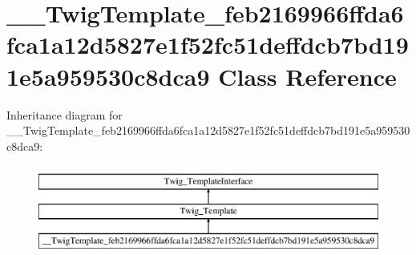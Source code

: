 \hypertarget{class_____twig_template__feb2169966ffda6fca1a12d5827e1f52fc51deffdcb7bd191e5a959530c8dca9}{}\section{\+\_\+\+\_\+\+Twig\+Template\+\_\+feb2169966ffda6fca1a12d5827e1f52fc51deffdcb7bd191e5a959530c8dca9 Class Reference}
\label{class_____twig_template__feb2169966ffda6fca1a12d5827e1f52fc51deffdcb7bd191e5a959530c8dca9}
Inheritance diagram for \+\_\+\+\_\+\+Twig\+Template\+\_\+feb2169966ffda6fca1a12d5827e1f52fc51deffdcb7bd191e5a959530c8dca9\+:\begin{figure}[H]
\begin{center}
\leavevmode
\includegraphics[height=3.000000cm]{class_____twig_template__feb2169966ffda6fca1a12d5827e1f52fc51deffdcb7bd191e5a959530c8dca9}
\end{center}
\end{figure}
